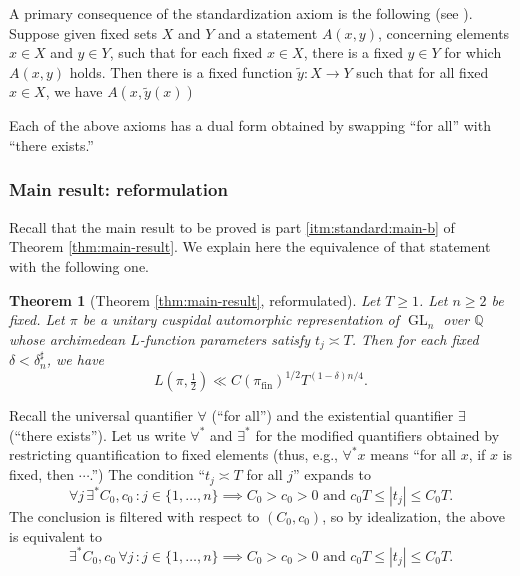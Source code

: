 \documentclass[reqno]{amsart}
\DeclareMathOperator{\GL}{GL}
\DeclareMathOperator{\fin}{fin}
\theoremstyle{plain} \newtheorem{theorem} {Theorem}
\theoremstyle{definition} \newtheorem{definition} [theorem] {Definition}
\theoremstyle{itplain} %
\numberwithin{equation}{section}
\numberwithin{theorem}{section}
\renewcommand{\geq}{\geqslant}
\renewcommand{\leq}{\leqslant}
\begin{document}
A primary consequence of the standardization axiom is the following (see \cite[Thm 1.3]{MR469763}).  Suppose given fixed sets $X$ and $Y$ and a statement $A(x,y)$, concerning elements $x \in X$ and $y \in Y$, such that for each fixed $x \in X$, there is a fixed $y \in Y$ for which $A(x,y)$ holds.  Then there is a fixed function $\tilde{y} : X \rightarrow Y$ such that for all fixed $x \in X$, we have $A(x, \tilde{y}(x))$ 

Each of the above axioms has a dual form obtained by swapping ``for all'' with ``there exists.''

\subsubsection{Main result: reformulation}\label{sec:main-result:-reform}
Recall that the main result to be proved is part \eqref{itm:standard:main-b} of Theorem \ref{thm:main-result}.  We explain here the equivalence of that statement with the following one.
\begin{theorem}[Theorem \ref{thm:main-result}, reformulated]\label{thm:main-result-reformulated}
  Let $T \geq 1$.  Let $n \geq 2$ be fixed.  Let $\pi$ be a unitary cuspidal automorphic representation of $\GL_n$ over $\mathbb{Q}$ whose archimedean $L$-function parameters satisfy $t_j \asymp T$.  Then for each fixed $\delta < \delta_n ^\sharp$,
  we have
  \begin{equation*}
    L(\pi, \tfrac{1}{2}) \ll C(\pi_{\fin})^{1/2} T^{(1-\delta)n/4}.
  \end{equation*}
\end{theorem}
Recall the universal quantifier $\forall$ (``for all'') and the existential quantifier $\exists$ (``there exists'').  Let us write $\forall^*$ and $\exists^*$ for the modified quantifiers obtained by restricting quantification to fixed elements (thus, e.g., $\forall^* x$ means ``for all $x$, if $x$ is fixed, then $\dotsb$.'')  The condition ``$t_j \asymp T$ for all $j$'' expands to
\begin{equation*}
  \forall j \, \exists^* C_0, c_0 \, : j \in \{1, \dotsc, n\} \implies C_0 > c_0 > 0 \text{ and }  c_0 T \leq |t_j| \leq C_0 T.
\end{equation*}
The conclusion is filtered with respect to $(C_0,c_0)$, so by idealization, the above is equivalent to
\begin{equation*}
  \exists^* C_0, c_0 \,   \forall j \, : j \in \{1, \dotsc, n\} \implies C_0 > c_0 > 0 \text{ and }  c_0 T \leq |t_j| \leq C_0 T.
\end{equation*}
\end{document}

